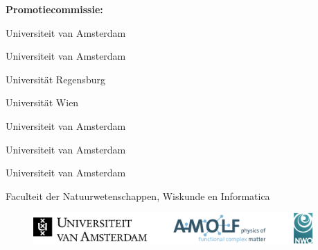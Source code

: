 \thispagestyle{empty}
\newpage






\begin{flushleft}
{\bfseries\large Promotiecommissie:}

\vspace{20pt}

\noindent {}  Universiteit van Amsterdam

\vspace{5pt}

\noindent \makebox[2.8cm][l]{}  Universiteit van Amsterdam

\vspace{20pt}


\noindent {}  Universit\"at Regensburg

\vspace{5pt}

\noindent \makebox[2.8cm][l]{}  Universit\"at Wien

\vspace{5pt}

\noindent \makebox[2.8cm][l]{}  Universiteit van Amsterdam

\vspace{5pt}

\noindent \makebox[2.8cm][l]{}  Universiteit van Amsterdam

\vspace{5pt}

\noindent \makebox[2.8cm][l]{}  Universiteit van Amsterdam





\vspace{20pt}

 Faculteit der Natuurwetenschappen, Wiskunde en Informatica


\end{flushleft}

\vspace{5.5cm}



\begin{figure}[h!]
	\centering
	\includegraphics[width=0.95\textwidth]{frontmatter/AllLogos.png}
\end{figure}

